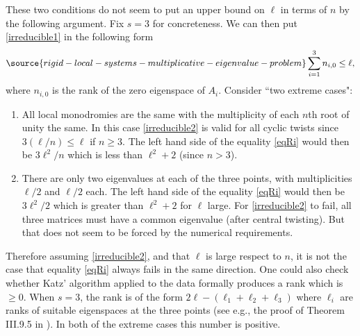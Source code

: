 These two conditions do not seem to put an upper bound on $\ell$ in terms of $n$ by the following argument. Fix $s=3$ for concreteness. We can then put \eqref{irreducible1} in the following form
\begin{equation}\label{irreducible2}
\source{rigid-local-systems-multiplicative-eigenvalue-problem}
\sum_{i=1}^3 n_{i,0}\leq \ell,
\end{equation}
where $n_{i,0}$ is the rank of the zero eigenspace of $A_i$.
Consider ``two extreme cases":
\begin{enumerate}
\item All local monodromies are the same with the multiplicity of each $n$th root of unity the same.
In this case \eqref{irreducible2} is valid  for all cyclic twists since $3(\ell/n)\leq \ell$ if $n\geq 3$. The left hand side of  the equality \eqref{eqRi} would then be $3\ell^2/n$ which is less than $\ell^2+2$ (since $n>3$).
\item There are only two eigenvalues at each of the  three points, with multiplicities $\ell/2$ and $\ell/2$ each. The left hand side of the equality \eqref{eqRi} would then be $3\ell^2/2$ which is greater than $\ell^2+2$ for  $\ell$ large. For \eqref{irreducible2} to fail, all three matrices must have a common eigenvalue (after central twisting). But that does not seem to be forced by the numerical requirements.
\end{enumerate}
Therefore assuming \eqref{irreducible2}, and  that $\ell$ is large  respect to $n$, it is not the case that equality \eqref{eqRi} always fails in the same direction. One could also check whether Katz' algorithm
applied to the data formally produces a rank which is $\geq 0$. When $s=3$, the rank is of the form $2\ell -(\ell_1 +\ell_2+\ell_3)$ where $\ell_i$ are ranks of suitable eigenspaces at the three points (see e.g., the proof of Theorem III.9.5 in \cite{MM}). In both of the extreme cases this number is positive.
